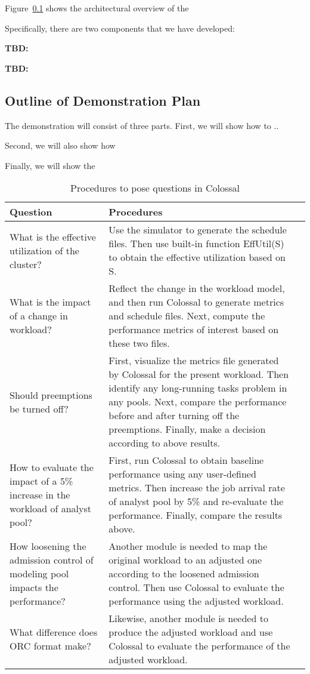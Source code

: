 Figure~\ref{} shows the architectural overview of the 

Specifically, there are two components that we have developed: 

\vspace{1mm}
\noindent\textbf{TBD:}

\vspace{1mm}
\noindent\textbf{TBD:} 

\vspace{-1mm}
\subsection{Outline of Demonstration Plan}
The demonstration will consist of three parts. First, we will show how to ..

Second, we will also show how 

Finally, we will show the 


\begin{table*}
  \centering
  \caption{Procedures to pose questions in Colossal}
  \begin{tabular}{|p{6cm}|p{10cm}|l|} \hline
    Question&Procedures\\ \hline
    What is the effective utilization of the cluster?& Use the
    simulator to generate the schedule files. Then use built-in
    function EffUtil(S) to obtain the effective utilization based on
    S.\\ \hline
    What is the impact of a change in workload?& Reflect the change in
    the workload model, and then run Colossal to generate metrics and
    schedule files. Next, compute the performance metrics of interest
    based on these two files.\\ \hline
    Should preemptions be turned off?& First, visualize the metrics
    file generated by Colossal for the present workload. Then identify
    any long-running tasks problem in any pools. Next, compare the
    performance before and after turning off the preemptions. Finally,
    make a decision according to above results.\\ \hline
    How to evaluate the impact of a 5\% increase in the workload of
    analyst pool?& First, run Colossal to obtain baseline performance
    using any user-defined metrics. Then increase the job arrival rate
    of analyst pool by 5\% and re-evaluate the performance. Finally,
    compare the results above.\\ \hline
    How loosening the admission control of modeling pool impacts the
    performance?& Another module is needed to map the original
    workload to an adjusted one according to the loosened admission
    control. Then use Colossal to evaluate the performance using the
    adjusted workload.\\ \hline
    What difference does ORC format make? & Likewise, another module
    is needed to produce the adjusted workload and use Colossal to
    evaluate the performance of the adjusted workload.\\ \hline
  \end{tabular}
\end{table*}


